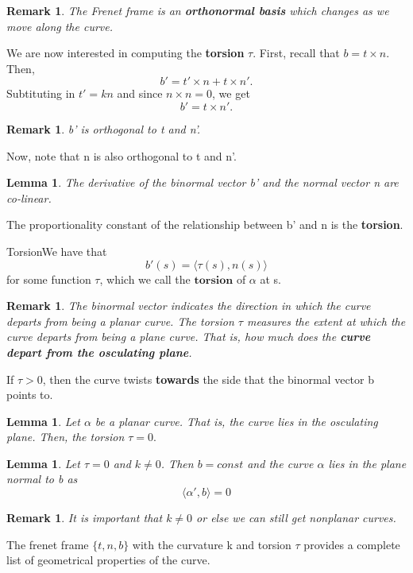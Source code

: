 \documentclass[twoside]{article}
\newtheorem{lemma}[theorem]{Lemma}
\newtheorem{remark}[theorem]{Remark}
\begin{document}
\begin{remark}The Frenet frame is an \textbf{orthonormal basis} which changes as we move along the curve.
\end{remark}

We are now interested in computing the \textbf{torsion} $\tau.$ First, recall that $b = t \times n.$ Then, 
$$
b' = t'\times n + t \times n'.
$$
Subtituting in $t' = kn$ and since $n \times n = 0$, we get 
$$
b' = t \times n'.
$$
\begin{remark}b' is orthogonal to t and n'.
\end{remark}

Now, note that n is also orthogonal to t and n'. 
\begin{lemma}The derivative of the binormal vector b' and the normal vector n are co-linear.
\end{lemma}

The proportionality constant of the relationship between b' and n is the \textbf{torsion}.

\begin{definition_exam}{Torsion}{}We have that $$b'(s) = \langle \tau(s), n(s) \rangle$$ for some function $\tau$, which we call the $\textbf{torsion}$ of $\alpha$ at s. 
\end{definition_exam}

\begin{remark}The binormal vector indicates the direction in which the curve departs from being a planar curve. The torsion $\tau$ measures the extent at which the curve departs from being a plane curve. That is, how much does the \textbf{curve depart from the osculating plane}.
\end{remark}

If $\tau > 0$, then the curve twists \textbf{towards} the side that the binormal vector b points to.
\begin{lemma}Let $\alpha$ be a planar curve. That is, the curve lies in the osculating plane. Then, the torsion $\tau = 0.$
\end{lemma}

\begin{lemma}Let $\tau = 0$ and $k \neq 0$. Then $b = const$ and the curve $\alpha$ lies in the plane normal to b as
$$
\langle \alpha', b \rangle = 0
$$
\end{lemma}

\begin{remark}It is important that $k \neq 0$ or else we can still get nonplanar curves.
\end{remark}
The frenet frame $\{t,n,b\}$ with the curvature k and torsion $\tau$ provides a complete list of geometrical properties of the curve.
\end{document}
